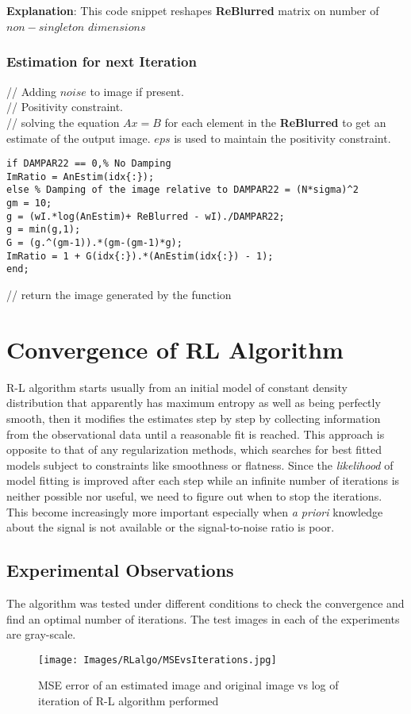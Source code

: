 \documentclass[a4paper]{book}
\begin{document}
\subparagraph*{}\textbf{\small Explanation}: This code snippet reshapes \textbf{\small ReBlurred} matrix on number of $ non-singleton$ $dimensions$ 
\

\subsubsection{Estimation for next Iteration}
 // Adding $ noise $ to image if present. \\
 // Positivity constraint. \\
 // solving the equation $ Ax=B  $ for each element in the \textbf{\small ReBlurred} to get an estimate of the output image. $ eps $ is used to maintain the positivity constraint.
\begin{lstlisting}
if DAMPAR22 == 0,% No Damping
ImRatio = AnEstim(idx{:});
else % Damping of the image relative to DAMPAR22 = (N*sigma)^2
gm = 10;
g = (wI.*log(AnEstim)+ ReBlurred - wI)./DAMPAR22;
g = min(g,1);
G = (g.^(gm-1)).*(gm-(gm-1)*g);
ImRatio = 1 + G(idx{:}).*(AnEstim(idx{:}) - 1);
end;
\end{lstlisting}
\bigskip
{} // return the image generated by the function



\section{\Large Convergence of RL Algorithm}\label{secConvRL}
R-L algorithm starts usually from an initial model of constant density distribution that apparently has maximum entropy as well as being perfectly smooth, then it modifies the estimates step by step by collecting information from the observational data until a reasonable fit is reached. This approach is opposite to that of any regularization methods, which searches for best fitted models subject to constraints like smoothness or flatness.
Since the \textit{likelihood} of model fitting is improved after each step while an infinite number of iterations is neither possible nor useful, we need to figure out when to stop the iterations. This become increasingly more important especially when \textit{a priori} knowledge about the signal is not available or the signal-to-noise ratio is poor.\cite{Bi94conv}
\newpage	
\subsection[Experiments]{Experimental Observations}
The algorithm was tested under different conditions to check the convergence and find an optimal number of iterations. The test images in each of the experiments are gray-scale. 
\begin{figure}[H]
	\texttt{[image: Images/RLalgo/MSEvsIterations.jpg]}
	\caption{MSE error of an estimated image and original image vs log of iteration of R-L algorithm performed }
	\label{MSE1}
\end{figure}
\end{document}
